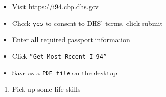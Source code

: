 \documentclass[
]{book}
\providecommand{\tightlist}{%
  \setlength{\itemsep}{0pt}\setlength{\parskip}{0pt}}
\begin{document}
\begin{itemize}
\item
  Visit \url{https://i94.cbp.dhs.gov}
\item
  Check \texttt{\textquotesingle{}yes\textquotesingle{}} to consent to DHS' terms, click submit
\item
  Enter all required passport information
\item
  Click \texttt{“Get\ Most\ Recent\ I-94”}
\item
  Save as a \texttt{PDF\ file} on the desktop
\end{itemize}

\begin{enumerate}
\def\labelenumi{\arabic{enumi}.}
\setcounter{enumi}{2}
\tightlist
\item
  Pick up some life skills
\end{enumerate}
\end{document}

